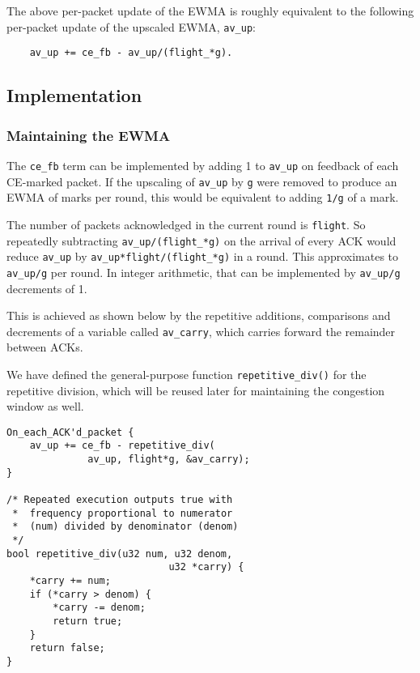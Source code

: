The above per-packet update of the EWMA is roughly equivalent to the following per-packet update of the upscaled EWMA, \texttt{av\_up}:
\begin{verbatim}
    av_up += ce_fb - av_up/(flight_*g).
\end{verbatim}

\subsection{Implementation}\label{prresp_implementation}

\subsubsection{Maintaining the EWMA}

The \texttt{ce\_fb} term can be implemented by adding 1 to \texttt{av\_up} on feedback of each CE-marked packet. If the upscaling of \texttt{av\_up} by \texttt{g} were removed to produce an EWMA of marks per round, this would be equivalent to adding \texttt{1/g} of a mark.

The number of packets acknowledged in the current round is \texttt{flight}. So repeatedly subtracting \texttt{av\_up/(flight\_*g)} on the arrival of every ACK would reduce \texttt{av\_up} by \texttt{av\_up*flight/(flight\_*g)} in a round. This approximates to \texttt{av\_up/g} per round. In integer arithmetic, that can be implemented by \texttt{av\_up/g} decrements of 1. 

This is achieved as shown %
below by the repetitive additions, comparisons and decrements of a variable called \texttt{av\_carry}, which carries forward the remainder between ACKs. 

We have defined the general-purpose function \texttt{repetitive\_div()} for the repetitive division, which will be reused later for maintaining the congestion window as well.

\begin{verbatim}
On_each_ACK'd_packet {
    av_up += ce_fb - repetitive_div(
              av_up, flight*g, &av_carry);
}

/* Repeated execution outputs true with 
 *  frequency proportional to numerator 
 *  (num) divided by denominator (denom)
 */
bool repetitive_div(u32 num, u32 denom, 
                            u32 *carry) {
    *carry += num;
    if (*carry > denom) {
        *carry -= denom;
        return true;
    }
    return false;
}
\end{verbatim}

